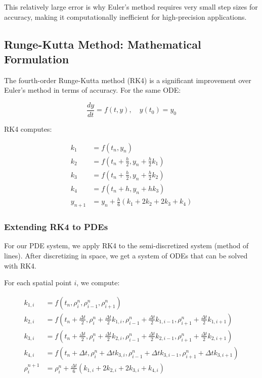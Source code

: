 \documentclass[a4paper,12pt]{article}
\begin{document}
This relatively large error is why Euler's method requires very small step sizes for accuracy, making it computationally inefficient for high-precision applications.

\subsection{Runge-Kutta Method: Mathematical Formulation}

The fourth-order Runge-Kutta method (RK4) is a significant improvement over Euler's method in terms of accuracy. For the same ODE:

\begin{equation}
\frac{dy}{dt} = f(t, y), \quad y(t_0) = y_0
\end{equation}

RK4 computes:

\begin{align}
k_1 &= f(t_n, y_n) \\
k_2 &= f(t_n + \frac{h}{2}, y_n + \frac{h}{2}k_1) \\
k_3 &= f(t_n + \frac{h}{2}, y_n + \frac{h}{2}k_2) \\
k_4 &= f(t_n + h, y_n + hk_3) \\
y_{n+1} &= y_n + \frac{h}{6}(k_1 + 2k_2 + 2k_3 + k_4)
\end{align}

\subsubsection{Extending RK4 to PDEs}

For our PDE system, we apply RK4 to the semi-discretized system (method of lines). After discretizing in space, we get a system of ODEs that can be solved with RK4.

For each spatial point $i$, we compute:

\begin{align}
k_{1,i} &= f(t_n, \rho_i^n, \rho_{i-1}^n, \rho_{i+1}^n) \\
k_{2,i} &= f(t_n + \frac{\Delta t}{2}, \rho_i^n + \frac{\Delta t}{2}k_{1,i}, \rho_{i-1}^n + \frac{\Delta t}{2}k_{1,i-1}, \rho_{i+1}^n + \frac{\Delta t}{2}k_{1,i+1}) \\
k_{3,i} &= f(t_n + \frac{\Delta t}{2}, \rho_i^n + \frac{\Delta t}{2}k_{2,i}, \rho_{i-1}^n + \frac{\Delta t}{2}k_{2,i-1}, \rho_{i+1}^n + \frac{\Delta t}{2}k_{2,i+1}) \\
k_{4,i} &= f(t_n + \Delta t, \rho_i^n + \Delta t k_{3,i}, \rho_{i-1}^n + \Delta t k_{3,i-1}, \rho_{i+1}^n + \Delta t k_{3,i+1}) \\
\rho_i^{n+1} &= \rho_i^n + \frac{\Delta t}{6}(k_{1,i} + 2k_{2,i} + 2k_{3,i} + k_{4,i})
\end{align}
\end{document}
